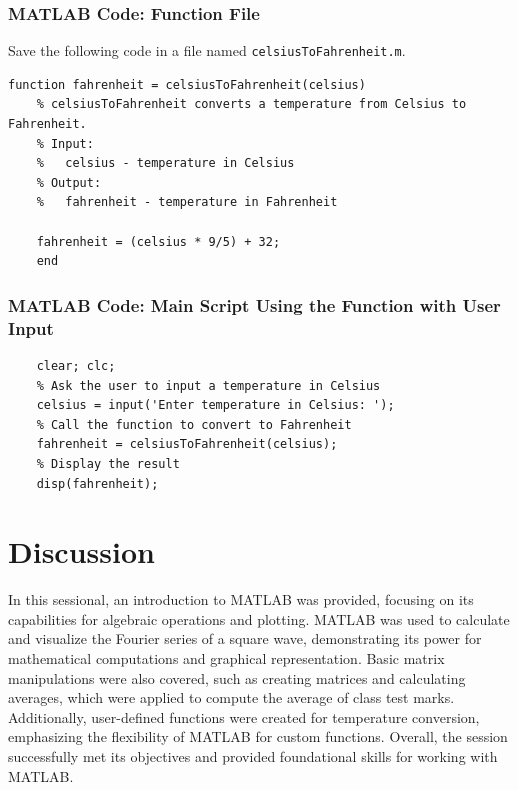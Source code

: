 \documentclass[a4paper,12pt]{article}
\begin{document}
\subsubsection{MATLAB Code: Function File}
Save the following code in a file named \texttt{celsiusToFahrenheit.m}.
\begin{lstlisting}[style=vscode-light, caption={User-Defined Function: celsiusToFahrenheit.m}]
	function fahrenheit = celsiusToFahrenheit(celsius)
	% celsiusToFahrenheit converts a temperature from Celsius to Fahrenheit.
	% Input:
	%   celsius - temperature in Celsius
	% Output:
	%   fahrenheit - temperature in Fahrenheit
	
	fahrenheit = (celsius * 9/5) + 32;
	end
\end{lstlisting}

\subsubsection*{MATLAB Code: Main Script Using the Function with User Input}
\begin{lstlisting}[style=vscode-light, caption={Using the User-Defined Function with User Input}]
	% Using the user-defined function to convert Celsius to Fahrenheit based on user input
	clear; clc;
	% Ask the user to input a temperature in Celsius
	celsius = input('Enter temperature in Celsius: ');
	% Call the function to convert to Fahrenheit
	fahrenheit = celsiusToFahrenheit(celsius);
	% Display the result
    disp(fahrenheit);
\end{lstlisting}




\section{Discussion}
In this sessional, an introduction to MATLAB was provided, focusing on its capabilities for algebraic operations and plotting. MATLAB was used to calculate and visualize the Fourier series of a square wave, demonstrating its power for mathematical computations and graphical representation. Basic matrix manipulations were also covered, such as creating matrices and calculating averages, which were applied to compute the average of class test marks. Additionally, user-defined functions were created for temperature conversion, emphasizing the flexibility of MATLAB for custom functions. Overall, the session successfully met its objectives and provided foundational skills for working with MATLAB.



	
	
	
\end{document}
